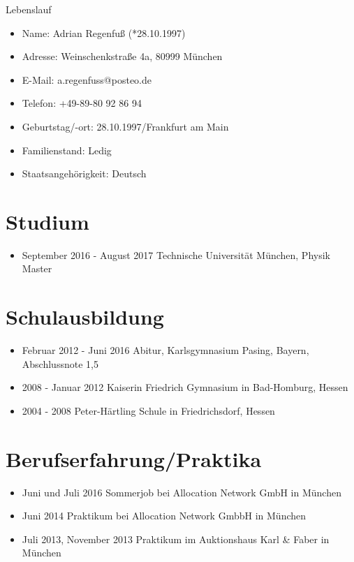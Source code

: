 \documentclass[11pt,a4paper]{article}
\begin{document}
\thispagestyle{empty}
\pagestyle{empty}

{\bf\centerline{{\huge Lebenslauf}}}
\vspace{15pt}

\begin{itemize}
\item[] Name: Adrian Regenfuß (*28.10.1997)
\item[] Adresse: Weinschenkstraße 4a, 80999 München
\item[] E-Mail: a.regenfuss@posteo.de
\item[] Telefon: +49-89-80 92 86 94
\item[] Geburtstag/-ort: 28.10.1997/Frankfurt am Main
\item[] Familienstand: Ledig
\item[] Staatsangehörigkeit: Deutsch
\end{itemize}

\section*{Studium}
\begin{itemize}
\setlength{\itemsep}{1pt}
\item[] September 2016 - August 2017 \hfill Technische Universität München, Physik Master
\end{itemize}

\section*{Schulausbildung}
\begin{itemize}
\setlength{\itemsep}{1pt}
\item[] Februar 2012 - Juni 2016 \hfill Abitur, Karlsgymnasium Pasing, Bayern, Abschlussnote 1,5
\item[] 2008 - Januar 2012 \hfill Kaiserin Friedrich Gymnasium in Bad-Homburg, Hessen
\item[] 2004 - 2008 \hfill Peter-Härtling Schule in Friedrichsdorf, Hessen
\end{itemize}

\section*{Berufserfahrung/Praktika}
\begin{itemize}
\setlength{\itemsep}{1pt}
\item[] Juni und Juli 2016 \hfill Sommerjob bei Allocation Network GmbH in München
\item[] Juni 2014 \hfill Praktikum bei Allocation Network GmbbH in München
\item[] Juli 2013, November 2013 \hfill Praktikum im Auktionshaus Karl \& Faber in München
\end{itemize}
\end{document}
